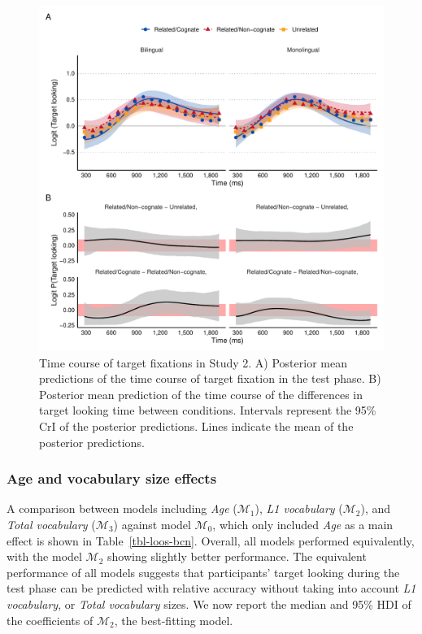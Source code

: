 \documentclass[
  12pt,
  b5paperpaper,
  twoside]{scrreprt}
\begin{document}
\begin{figure}

{\centering \includegraphics{chapters/03-chapter-3_files/figure-pdf/fig-epreds-1.pdf}

}

\caption{\label{fig-epreds}Time course of target fixations in Study 2.
A) Posterior mean predictions of the time course of target fixation in
the test phase. B) Posterior mean prediction of the time course of the
differences in target looking time between conditions. Intervals
represent the 95\% CrI of the posterior predictions. Lines indicate the
mean of the posterior predictions.}

\end{figure}

\hypertarget{age-and-vocabulary-size-effects-1}{%
\subsubsection{Age and vocabulary size
effects}\label{age-and-vocabulary-size-effects-1}}

A comparison between models including \emph{Age} (\(\mathcal{M}_{1}\)),
\emph{L1 vocabulary} (\(\mathcal{M}_{2}\)), and \emph{Total vocabulary}
(\(\mathcal{M}_{3}\)) against model \(\mathcal{M}_{0}\), which only
included \emph{Age} as a main effect is shown in
Table~\ref{tbl-loos-bcn}. Overall, all models performed equivalently,
with the model \(\mathcal{M}_{2}\) showing slightly better performance.
The equivalent performance of all models suggests that participants'
target looking during the test phase can be predicted with relative
accuracy without taking into account \emph{L1 vocabulary}, or
\emph{Total vocabulary} sizes. We now report the median and 95\% HDI of
the coefficients of \(\mathcal{M}_{2}\), the best-fitting model.
\end{document}
